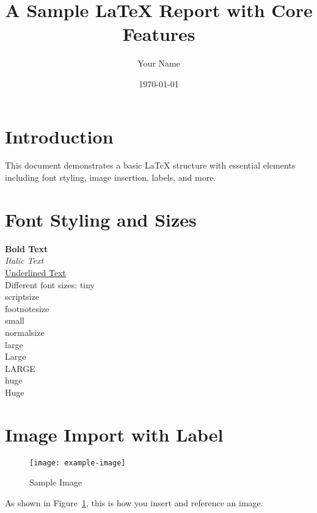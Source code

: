 \documentclass[12pt]{article} %
\begin{document}
\title{\textbf{A Sample LaTeX Report with Core Features}}
\author{Your Name}
\date{\today}
\maketitle

\section{Introduction}
\justifying
This document demonstrates a basic LaTeX structure with essential elements including font styling, image insertion, labels, and more.

\section{Font Styling and Sizes}
\textbf{Bold Text} \\
\textit{Italic Text} \\
\underline{Underlined Text} \\

\vspace{0.3cm}
Different font sizes:
{\tiny tiny} \\
{\scriptsize scriptsize} \\
{\footnotesize footnotesize} \\
{\small small} \\
{\normalsize normalsize} \\
{\large large} \\
{\Large Large} \\
{\LARGE LARGE} \\
{\huge huge} \\
{\Huge Huge}

\section{Image Import with Label}
\begin{figure}[h!]
    \centering
    \texttt{[image: example-image]} %
    \caption{Sample Image}
    \label{fig:sample_image}
\end{figure}

As shown in Figure~\ref{fig:sample_image}, this is how you insert and reference an image.
\end{document}
